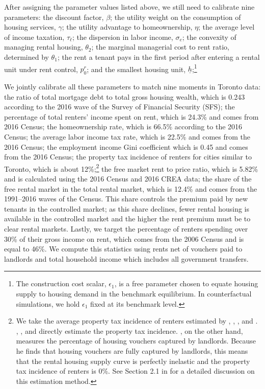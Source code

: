 \documentclass[parskip=full]{article}
\begin{document}
After assigning the parameter values listed above, we still need to calibrate nine parameters: the discount factor, $\beta$; the utility weight on the consumption of housing services, $\gamma$; the utility advantage to homeownership, $\eta$; the average level of income taxation, $\tau_{\ell}$; the dispersion in labor income, $\sigma_{e}$; the convexity of managing rental housing, $\theta_{2}$; the marginal managerial cost to rent ratio, determined by $\theta_{1}$; the rent a tenant pays in the first period after entering a rental unit under rent control, $p^{r}_{0}$; and the smallest housing unit, $\underline{h}$;\footnote{The construction cost scalar, $\epsilon_{1}$, is a free parameter chosen to equate housing supply to housing demand in the benchmark equilibrium. In counterfactual simulations, we hold $\epsilon_{1}$ fixed at its benchmark level.}

We jointly calibrate all these parameters to match nine moments in Toronto data: the ratio of total mortgage debt to total gross housing wealth, which is 0.243 according to the 2016 wave of the Survey of Financial Security (SFS); the percentage of total renters' income spent on rent, which is 24.3\% and comes from 2016 Census; the homeownership rate, which is 66.5\% according to the 2016 Census; the average labor income tax rate, which is 22.5\% and comes from the 2016 Census; the employment income Gini coefficient which is 0.45 and comes from the 2016 Census; the property tax incidence of renters for cities similar to Toronto, which is about 12\%;\footnote{We take the average property tax incidence of renters estimated by \citet{cy-1994}, \citet{susin-2002}, \citet{fack-2006}, and \citet{sy-2020}. \citet{cy-1994}, \citet{fack-2006}, and \citet{sy-2020} directly estimate the property tax incidence. \citet{susin-2002}, on the other hand, measures the percentage of housing vouchers captured by landlords. Because he finds that housing vouchers are fully captured by landlords, this means that the rental housing supply curve is perfectly inelastic and the property tax incidence of renters is 0\%. See Section 2.1 in \citet{rs-2023} for a detailed discussion on this estimation method.} the free market rent to price ratio, which is 5.82\% and is calculated using the 2016 Census and 2016 CREA data; the share of the free rental market in the total rental market, which is 12.4\% and comes from the 1991--2016 waves of the Census. This share controls the premium paid by new tenants in the controlled market; as this share declines, fewer rental housing is available in the controlled market and the higher the rent premium must be to clear rental markets. Lastly, we target the percentage of renters spending over 30\% of their gross income on rent, which comes from the 2006 Census and is equal to 46\%. We compute this statistics using rents net of vouchers paid to landlords and total household income which includes all government transfers. 
\end{document}
